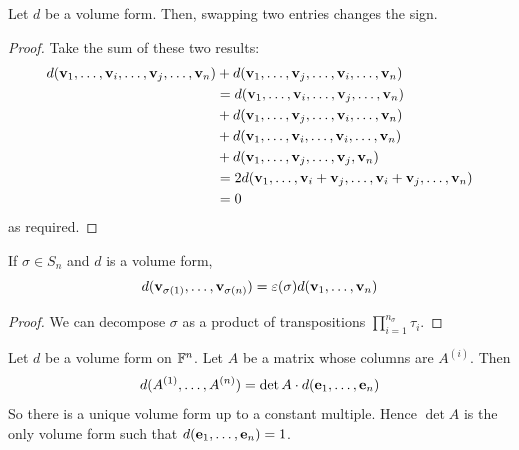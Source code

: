 \documentclass[a4paper]{article}
\begin{document}
\begin{lemma}
	Let $ d $ be a volume form.
	Then, swapping two entries changes the sign.
\end{lemma}
\begin{proof}
	Take the sum of these two results:
	\begin{align*}
		d({\bf v}_1, \dots, {\bf v}_i, \dots, {\bf v}_j, \dots, {\bf v}_n) & + d({\bf v}_1, \dots, {\bf v}_j, \dots, {\bf v}_i, \dots, {\bf v}_n)               \\
		                                           & = d({\bf v}_1, \dots, {\bf v}_i, \dots, {\bf v}_j, \dots, {\bf v}_n)               \\
		                                           & + d({\bf v}_1, \dots, {\bf v}_j, \dots, {\bf v}_i, \dots, {\bf v}_n)               \\
		                                           & + d({\bf v}_1, \dots, {\bf v}_i, \dots, {\bf v}_i, \dots, {\bf v}_n)               \\
		                                           & + d({\bf v}_1, \dots, {\bf v}_j, \dots, {\bf v}_j, {\bf v}_n)                      \\
		                                           & = 2 d({\bf v}_1, \dots, {\bf v}_i + {\bf v}_j, \dots, {\bf v}_i + {\bf v}_j, \dots, {\bf v}_n) \\
		                                           & = 0
	\end{align*}
	as required.
\end{proof}

\begin{corollary}
	If $ \sigma \in S_n $ and $ d $ is a volume form,
	\[
		d({\bf v}_{\sigma(1)}, \dots, {\bf v}_{\sigma(n)}) = \varepsilon(\sigma) d({\bf v}_1, \dots, {\bf v}_n)
	\]
\end{corollary}
\begin{proof}
	We can decompose $ \sigma $ as a product of transpositions $ \prod_{i=1}^{n_\sigma} \tau_i $.
\end{proof}

\begin{theorem}
	Let $ d $ be a volume form on $ {\mathbb{F}}^n $.
	Let $ A $ be a matrix whose columns are $ A^{(i)} $.
	Then
	\[
		d(A^{(1)}, \dots, A^{(n)}) = \det A \cdot d({\bf e}_1, \dots, {\bf e}_n)
	\]
	So there is a unique volume form up to a constant multiple.
	Hence $ \det A $ is the only volume form such that $ d({\bf e}_1, \dots, {\bf e}_n) = 1 $.
\end{theorem}
\end{document}

